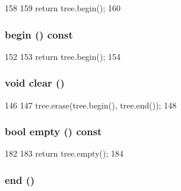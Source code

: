 \begin{DoxyCode}
158     {
159         return tree.begin();
160     }
\end{DoxyCode}
\hypertarget{classAddrRangeMap_aa4b02d4f1a8500fb07a551069060709f}{
\subsubsection[{begin}]{ begin () const}}
\label{classAddrRangeMap_aa4b02d4f1a8500fb07a551069060709f}



\begin{DoxyCode}
152     {
153         return tree.begin();
154     }
\end{DoxyCode}
\hypertarget{classAddrRangeMap_ac8bb3912a3ce86b15842e79d0b421204}{
\subsubsection[{clear}]{\setlength{\rightskip}{0pt plus 5cm}void clear ()}}
\label{classAddrRangeMap_ac8bb3912a3ce86b15842e79d0b421204}



\begin{DoxyCode}
146     {
147         tree.erase(tree.begin(), tree.end());
148     }
\end{DoxyCode}
\hypertarget{classAddrRangeMap_ac6e61de369e994009e36f344f99c15ad}{
\subsubsection[{empty}]{\setlength{\rightskip}{0pt plus 5cm}bool empty () const}}
\label{classAddrRangeMap_ac6e61de369e994009e36f344f99c15ad}



\begin{DoxyCode}
182     {
183         return tree.empty();
184     }
\end{DoxyCode}
\hypertarget{classAddrRangeMap_acad38d52497a975bfb6f2f6acd76631f}{
\subsubsection[{end}]{ end ()}}
\label{classAddrRangeMap_acad38d52497a975bfb6f2f6acd76631f}



